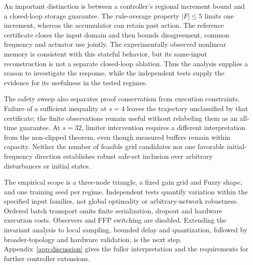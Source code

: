An important distinction is between a controller's regional increment
bound and a closed-loop storage guarantee. The rule-average property
$|F|\le5$ limits one increment, whereas the accumulator can retain
past action. The reference certificate closes the input domain and
then bounds disagreement, common frequency and actuator use jointly.
The experimentally observed nonlinear memory is consistent with this
stateful behavior, but its same-input reconstruction is not a separate
closed-loop ablation. Thus the analysis supplies a reason to investigate
the response, while the independent tests supply the evidence for its
usefulness in the tested regimes.

The safety sweep also separates proof conservatism from execution
constraints. Failure of a sufficient inequality at $s=4$ leaves the
trajectory unclassified by that certificate; the finite observations
remain useful without relabeling them as an all-time guarantee.
At $s=32$, limiter intervention requires a different interpretation
from the non-clipped theorem, even though measured buffers remain
within capacity. Neither the number of feasible grid candidates nor
one favorable initial-frequency direction establishes robust safe-set
inclusion over arbitrary disturbances or initial states.

The empirical scope is a three-node triangle, a fixed gain grid and
Fuzzy shape, and one training seed per regime. Independent tests
quantify variation within the specified input families, not global
optimality or arbitrary-network robustness. Ordered batch transport
omits finite serialization, dropout and hardware execution costs.
Observers and FFP switching are disabled. Extending the invariant
analysis to local sampling, bounded delay and quantization, followed
by broader-topology and hardware validation, is the next step.
Appendix~\ref{app:discussion} gives the fuller interpretation and
the requirements for further controller extensions.

